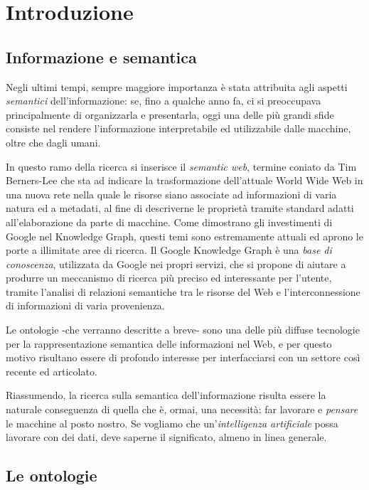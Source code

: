 \mainmatter

\chapter{Introduzione}

\section{Informazione e semantica}
Negli ultimi tempi, sempre maggiore importanza è stata attribuita agli aspetti \textit{semantici} dell'informazione: se, fino a qualche anno fa, ci si preoccupava principalmente di organizzarla e presentarla, oggi una delle più grandi sfide consiste nel rendere l'informazione interpretabile ed utilizzabile dalle macchine, oltre che dagli umani. 

In questo ramo della ricerca si inserisce il \textit{semantic web}\cite{semanticweb}, termine coniato da Tim Berners-Lee che sta ad indicare la trasformazione dell'attuale World Wide Web in una nuova rete nella quale le risorse siano associate ad informazioni di varia natura ed a metadati, al fine di descriverne le proprietà tramite standard adatti all'elaborazione da parte di macchine. Come dimostrano gli investimenti di Google nel Knowledge Graph\cite{knowledgegraph}, questi temi sono estremamente attuali ed aprono le porte a illimitate aree di ricerca. Il Google Knowledge Graph è una \textit{base di conoscenza}, utilizzata da Google nei propri servizi, che si propone di aiutare a produrre un meccanismo di ricerca più preciso ed interessante per l'utente, tramite l'analisi di relazioni semantiche tra le risorse del Web e l'interconnessione di informazioni di varia provenienza.

Le ontologie -che verranno descritte a breve- sono una delle più diffuse tecnologie per la rappresentazione semantica delle informazioni nel Web, e per questo motivo risultano essere di profondo interesse per interfacciarsi con un settore così recente ed articolato. 

Riassumendo, la ricerca sulla semantica dell'informazione risulta essere la naturale conseguenza di quella che è, ormai, una necessità: far lavorare e \textit{pensare} le macchine al posto nostro. Se vogliamo che un'\textit{intelligenza artificiale} possa lavorare con dei dati, deve saperne il significato, almeno in linea generale.

\clearpage

\section{Le ontologie}
